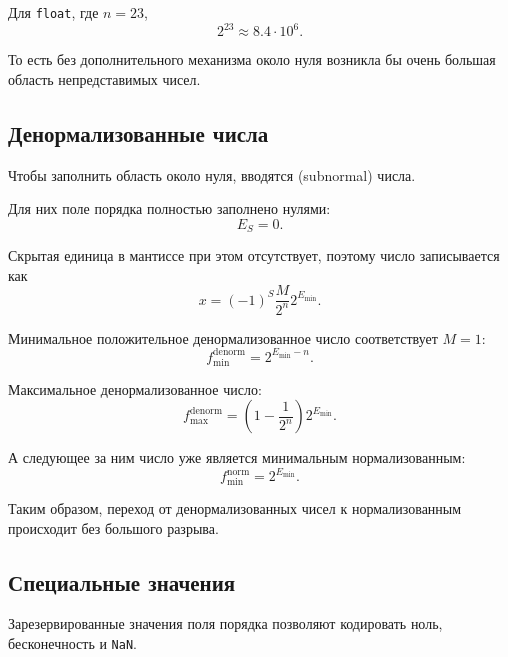 \documentclass[../final.tex]{subfiles}
\begin{document}
Для \texttt{float}, где $n=23$,
%
\[
    2^{23}
    \approx
    8.4\cdot10^6.
\]

То есть без дополнительного механизма около нуля возникла бы
очень большая область непредставимых чисел.


\subsection{Денормализованные числа}

Чтобы заполнить область около нуля, вводятся
 (subnormal) числа.

Для них поле порядка полностью заполнено нулями:
%
\[
    E_S=0.
\]

Скрытая единица в мантиссе при этом отсутствует, поэтому число
записывается как
%
\begin{equation*}
    x
    =
    (-1)^S
    \frac{M}{2^n}
    2^{E_{\min}}.
\end{equation*}

Минимальное положительное денормализованное число соответствует
$M=1$:
%
\begin{equation*}
    f_{\min}^{\mathrm{denorm}}
    =
    2^{E_{\min}-n}.
\end{equation*}

Максимальное денормализованное число:
%
\begin{equation*}
    f_{\max}^{\mathrm{denorm}}
    =
    \left(
        1-\frac{1}{2^n}
    \right)
    2^{E_{\min}}.
\end{equation*}

А следующее за ним число уже является минимальным
нормализованным:
%
\begin{equation*}
    f_{\min}^{\mathrm{norm}}
    =
    2^{E_{\min}}.
\end{equation*}

Таким образом, переход от денормализованных чисел к
нормализованным происходит без большого разрыва.


\subsection{Специальные значения}

Зарезервированные значения поля порядка позволяют кодировать
ноль, бесконечность и \texttt{NaN}.
\end{document}

